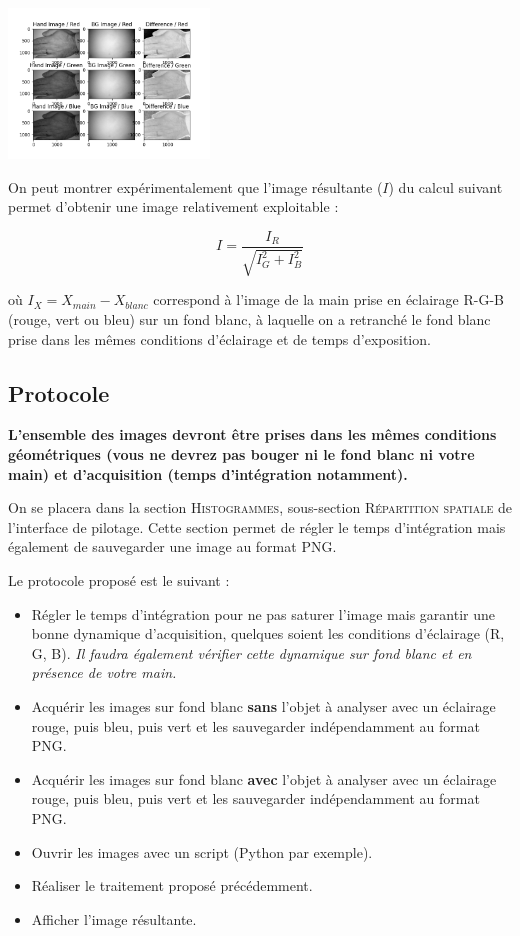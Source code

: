 \documentclass[a4paper,11pt,titlepage]{article} %
\begin{document}
\begin{center}
	\includegraphics[width=0.4\textwidth]{images/hands.png}
\end{center}

On peut montrer expérimentalement que l'image résultante ($I$) du calcul suivant permet d'obtenir une image relativement exploitable :

$$I = \frac{I_R}{\sqrt{I_G^2 + I_B^2}}$$

où $I_X = X_{main} - X_{blanc}$ correspond à l'image de la main prise en éclairage R-G-B (rouge, vert ou bleu) sur un fond blanc, à laquelle on a retranché le fond blanc prise dans les mêmes conditions d'éclairage et de temps d'exposition.

\subsection{Protocole}

\textbf{L'ensemble des images devront être prises dans les mêmes conditions géométriques (vous ne devrez pas bouger ni le fond blanc ni votre main) et d'acquisition (temps d'intégration notamment).}

On se placera dans la section \textsc{Histogrammes}, sous-section \textsc{Répartition spatiale} de l'interface de pilotage. Cette section permet de régler le temps d'intégration mais également de sauvegarder une image au format PNG.

\medskip

Le protocole proposé est le suivant :

\begin{itemize}
	\item Régler le temps d'intégration pour ne pas saturer l'image mais garantir une bonne dynamique d'acquisition, quelques soient les conditions d'éclairage (R, G, B). \textit{Il faudra également vérifier cette dynamique sur fond blanc et en présence de votre main.}
	\item Acquérir les images sur fond blanc \textbf{sans} l'objet à analyser avec un éclairage rouge, puis bleu, puis vert et les sauvegarder indépendamment au format PNG.
	\item Acquérir les images sur fond blanc \textbf{avec} l'objet à analyser avec un éclairage rouge, puis bleu, puis vert et les sauvegarder indépendamment au format PNG.
	\item Ouvrir les images avec un script (Python par exemple).
	\item Réaliser le traitement proposé précédemment.
	\item Afficher l'image résultante.
\end{itemize}
\end{document}
